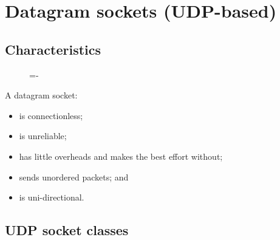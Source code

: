 \documentclass[a4paper]{systems-software}
\begin{document}
\section*{Datagram sockets (UDP-based)}

\subsection*{Characteristics}

\begin{figure}[H]
	\lineskip=-\fboxrule
\end{figure}

A datagram socket:
\begin{itemize}
	\item is connectionless;
	\item is unreliable;
	\item has little overheads and makes the best effort without;
	\item sends unordered packets; and
	\item is uni-directional.
\end{itemize}


\subsection*{UDP socket classes}
\end{document}
